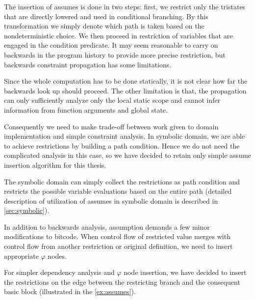 The insertion of assumes is done in two steps: first, we restrict only the
tristates that are directly lowered and used in conditional branching. By this
transformation we simply denote which path is taken based on the nondeterministic
choice. We then proceed in restriction of variables that are engaged in the condition
predicate. It may seem reasonable to carry on backwards in the program history to
provide more precise restriction, but backwards constraint propagation has some
limitations.

Since the whole computation has to be done statically, it is not clear how far the
backwards look up should proceed. The other limitation is that, the propagation
can only sufficiently analyze only the local static scope and cannot infer
information from function arguments and global state.

Consequently we need to make trade-off between work given to domain
implementation and simple constraint analysis. In symbolic domain, we are able
to achieve restrictions by building a path condition. Hence we do not need the
complicated analysis in this case, so we have decided to retain only simple
assume insertion algorithm for this thesis.

The symbolic domain can simply collect the restrictions as path condition and
restricts the possible variable evaluations based on the entire path
(detailed description of utilization of assumes in symbolic domain is
described in \autoref{sec:symbolic}).

In addition to backwards analysis, assumption demands a few minor
modifications to bitcode. When control flow of restricted value merges with
control flow from another restriction or original definition, we need to insert
appropriate $\varphi$ nodes.

For simpler dependency analysis and $\varphi$ node insertion, we have decided
to insert the restrictions on the edge between the restricting branch and the consequent
basic block (illustrated in the \autoref{ex:assumes}).

